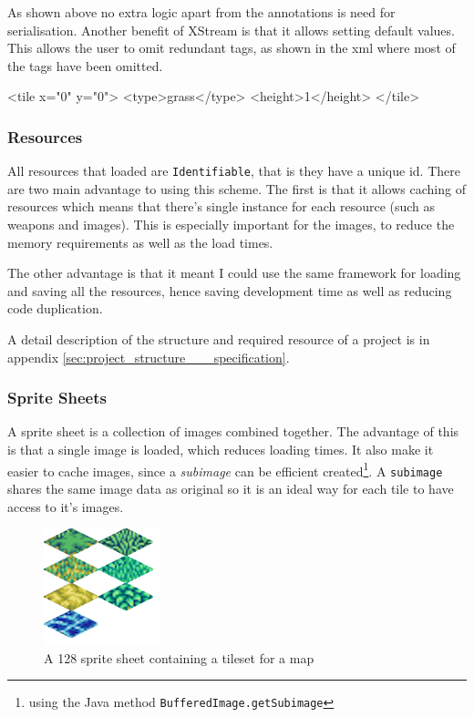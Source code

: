 As shown above no extra logic apart from the annotations is need for serialisation.  Another benefit of XStream is that it allows setting default values. This allows the user to omit redundant tags, as shown in the xml where most of the tags have been omitted.
\begin{lst:tile}[caption=Serialised form of the above class. ]
<tile x="0" y="0">
	<type>grass</type>
	<height>1</height>
</tile>
\end{lst:tile}


\subsubsection{Resources}

All resources that loaded are \texttt{Identifiable}, that is they have a unique id.  There are two main advantage to using this scheme. The first is that it allows caching of resources which means that there's single instance for each resource (such as weapons and images). This is especially important for the images, to reduce the memory requirements as well as the load times.

The other advantage is that it meant I could use the same framework for loading and saving all the resources, hence saving development time as well as reducing code duplication. 

A detail description of the structure and  required resource of a project is in appendix \ref{sec:project_structure___specification}.

\subsubsection{Sprite Sheets}
\label{ssub:sprite_sheets}


A sprite sheet is a collection of images combined together. The advantage of this is that a single image is loaded, which reduces loading times. It also make it easier to cache images, since a \emph{subimage} can be efficient created\footnote{using the Java method \texttt{BufferedImage.getSubimage}}. A \texttt{subimage} shares the same image data as original so it is an ideal way for each tile to have access to it's images\cite{bufferedImage}.    

\begin{figure}[htbp]
	\centering
		\includegraphics{figures/tileset.png}
	\caption{A 128 sprite sheet containing a tileset for a map}
	\label{fig:figures_tileset}
\end{figure}


